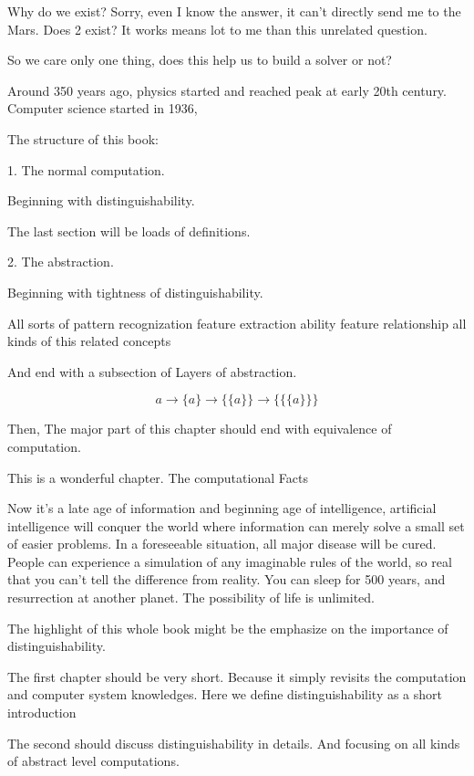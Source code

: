  Why do we exist? Sorry, even I know the answer, it can't directly send me to the Mars. Does 2 exist? It works means lot to me than this unrelated question.

 So we care only one thing, does this help us to build a solver or not?

 Around 350 years ago, physics started and reached peak at early 20th century. Computer science started in 1936,

\noindent\makebox[\linewidth]{\rule{\textwidth}{1pt}}

The structure of this book:

1. The normal computation.

Beginning with distinguishability.

The last section will be loads of definitions.

2. The abstraction.

Beginning with tightness of distinguishability.

All sorts of pattern recognization feature extraction ability feature relationship all kinds of this related concepts

And end with a subsection of Layers of abstraction.

\[a \rightarrow \{ a\}  \rightarrow \{\{ a\}\}  \rightarrow \{\{\{ a\}\}\} \]

Then, The major part of this chapter should end with equivalence of computation.

This is a wonderful chapter. The computational Facts

\noindent\makebox[\linewidth]{\rule{\textwidth}{1pt}}

Now it's a late age of information and beginning age of intelligence, artificial intelligence will conquer the world where information can merely solve a small set of easier problems. In a foreseeable situation, all major disease will be cured. People can experience a simulation of any imaginable rules of the world, so real that you can't tell the difference from reality. You can sleep for 500 years, and resurrection at another planet. The possibility of life is unlimited.

The highlight of this whole book might be the emphasize on the importance of distinguishability.

The first chapter should be very short. Because it simply revisits the computation and computer system knowledges. Here we define distinguishability as a short introduction

The second should discuss distinguishability in details. And focusing on all kinds of abstract level computations.

